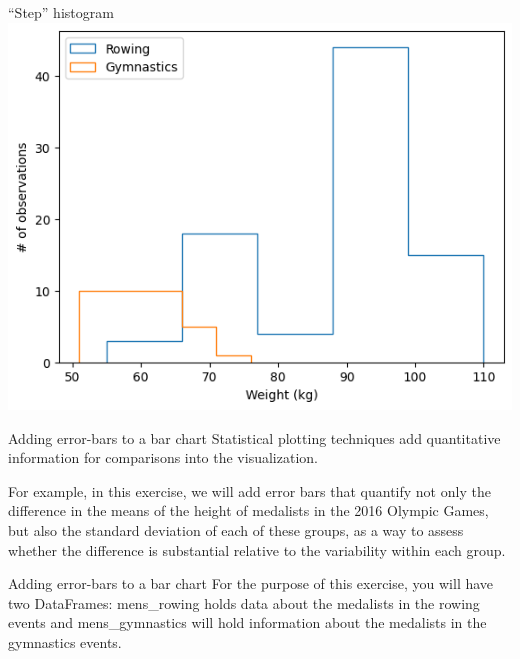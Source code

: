 \documentclass[
  ignorenonframetext,
]{beamer}
\begin{document}
\begin{frame}{``Step'' histogram}
\label{step-histogram-5}
\includegraphics{../images/im243.png}
\end{frame}

\begin{frame}{Adding error-bars to a bar chart}
\label{adding-error-bars-to-a-bar-chart}
Statistical plotting techniques add quantitative information for
comparisons into the visualization.

For example, in this exercise, we will add error bars that quantify not
only the difference in the means of the height of medalists in the 2016
Olympic Games, but also the standard deviation of each of these groups,
as a way to assess whether the difference is substantial relative to the
variability within each group.
\end{frame}

\begin{frame}{Adding error-bars to a bar chart}
\label{adding-error-bars-to-a-bar-chart-1}
For the purpose of this exercise, you will have two DataFrames:
mens\_rowing holds data about the medalists in the rowing events and
mens\_gymnastics will hold information about the medalists in the
gymnastics events.
\end{frame}
\end{document}
